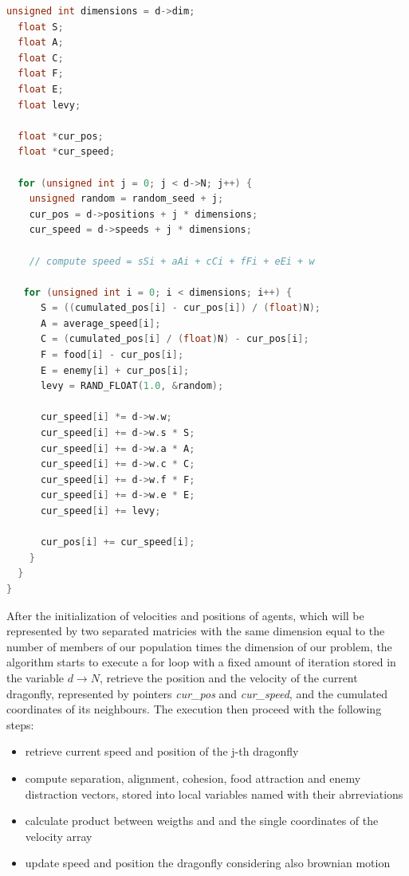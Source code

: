 \documentclass[10pt]{article}
\begin{document}
\begin{multicols}{2}
\begin{lstlisting}[language=C,caption={first implementation of the dragonfly algorithm}]
  unsigned int dimensions = d->dim;
  float S;
  float A;
  float C;
  float F;
  float E;
  float levy;

  float *cur_pos;
  float *cur_speed;

  for (unsigned int j = 0; j < d->N; j++) {
    unsigned random = random_seed + j;
    cur_pos = d->positions + j * dimensions;
    cur_speed = d->speeds + j * dimensions;

    // compute speed = sSi + aAi + cCi + fFi + eEi + w

   for (unsigned int i = 0; i < dimensions; i++) {
      S = ((cumulated_pos[i] - cur_pos[i]) / (float)N);
      A = average_speed[i];
      C = (cumulated_pos[i] / (float)N) - cur_pos[i];
      F = food[i] - cur_pos[i];
      E = enemy[i] + cur_pos[i];
      levy = RAND_FLOAT(1.0, &random);

      cur_speed[i] *= d->w.w;
      cur_speed[i] += d->w.s * S;
      cur_speed[i] += d->w.a * A;
      cur_speed[i] += d->w.c * C;
      cur_speed[i] += d->w.f * F;
      cur_speed[i] += d->w.e * E;
      cur_speed[i] += levy;

      cur_pos[i] += cur_speed[i];
    }
  }
}
\end{lstlisting}

\noindent After the initialization of velocities and positions of agents,
which will be represented by two separated matricies with the same dimension equal to the number of members of our
population times the dimension of our problem, the algorithm starts to execute a for loop 
with a fixed amount of iteration stored in the variable $d\rightarrow N$,  retrieve
the position and the velocity of the current dragonfly, represented by pointers
\textit{cur\_pos} and \textit{cur\_speed},
and the cumulated coordinates of its neighbours. 
The execution then proceed with the following steps:

\begin{itemize}
  \item retrieve current speed and position of the j-th dragonfly
  \item compute separation, alignment, cohesion, food attraction and enemy distraction vectors,
  stored into local variables named with their abrreviations
  \item calculate product between weigths and and the single coordinates of the velocity array
  \item update speed and position the dragonfly considering also brownian motion
\end{itemize}


\end{multicols}
\end{document}
